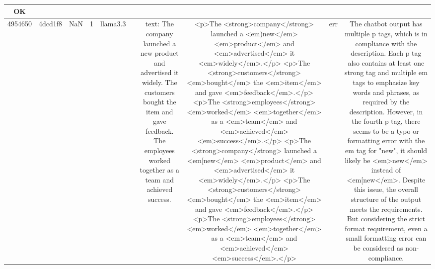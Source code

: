 \begin{table}[h!]
\begin{tabular}{|c|c|c|c|c|c|c|c|c|c|}
OK\\
\hline
4954650 & 4dcd1f8 & NaN & 1 & llama3.3 &  & text: The company launched a new product and advertised it widely. The customers bought the item and gave feedback. The employees worked together as a team and achieved success. & <p>The <strong>company</strong> launched a <em)new</em> <em>product</em> and <em>advertised</em> it <em>widely</em>.</p>
<p>The <strong>customers</strong> <em>bought</em> the <em>item</em> and gave <em>feedback</em>.</p>
<p>The <strong>employees</strong> <em>worked</em> <em>together</em> as a <em>team</em> and <em>achieved</em> <em>success</em>.</p>
<p>The <strong>company</strong> launched a <em[new</em> <em>product</em> and <em>advertised</em> it <em>widely</em>.</p>
<p>The <strong>customers</strong> <em>bought</em> the <em>item</em> and gave <em>feedback</em>.</p>
<p>The <strong>employees</strong> <em>worked</em> <em>together</em> as a <em>team</em> and <em>achieved</em> <em>success</em>.</p> & err & The chatbot output has multiple p tags, which is in compliance with the description. Each p tag also contains at least one strong tag and multiple em tags to emphasize key words and phrases, as required by the description. However, in the fourth p tag, there seems to be a typo or formatting error with the em tag for "new", it should likely be <em>new</em> instead of <em[new</em>. Despite this issue, the overall structure of the output meets the requirements. But considering the strict format requirement, even a small formatting error can be considered as non-compliance.


\end{tabular}
\end{table}

